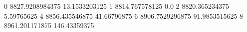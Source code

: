 0 8827.9208984375 13.1533203125
1 8814.767578125 0.0
2 8820.365234375 5.59765625
4 8856.435546875 41.66796875
6 8906.7529296875 91.9853515625
8 8961.201171875 146.43359375
